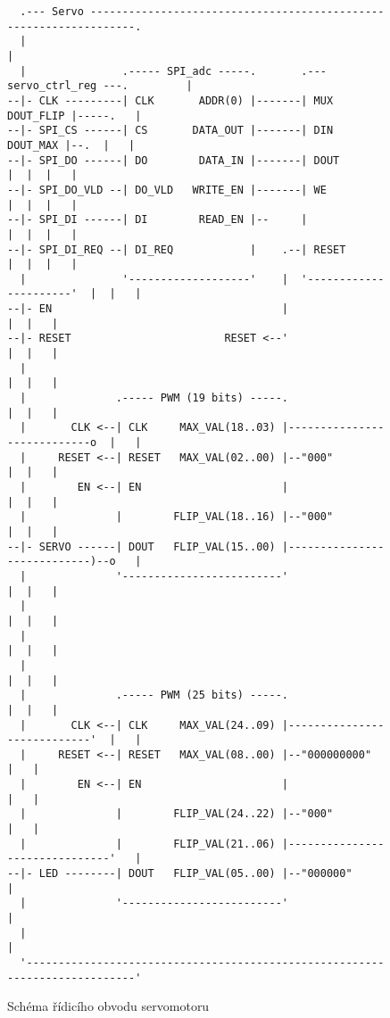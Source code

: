 \begin{figure}[h]
\caption{Schéma řídicího obvodu servomotoru}
\centering
\begin{Verbatim}
  .--- Servo ------------------------------------------------------------------.
  |                                                                            |
  |               .----- SPI_adc -----.       .--- servo_ctrl_reg ---.         |
--|- CLK ---------| CLK       ADDR(0) |-------| MUX        DOUT_FLIP |-----.   |
--|- SPI_CS ------| CS       DATA_OUT |-------| DIN         DOUT_MAX |--.  |   |
--|- SPI_DO ------| DO        DATA_IN |-------| DOUT                 |  |  |   |
--|- SPI_DO_VLD --| DO_VLD   WRITE_EN |-------| WE                   |  |  |   |
--|- SPI_DI ------| DI        READ_EN |--     |                      |  |  |   |
--|- SPI_DI_REQ --| DI_REQ            |    .--| RESET                |  |  |   |
  |               '-------------------'    |  '----------------------'  |  |   |
--|- EN                                    |                            |  |   |
--|- RESET                        RESET <--'                            |  |   |
  |                                                                     |  |   |
  |              .----- PWM (19 bits) -----.                            |  |   |
  |       CLK <--| CLK     MAX_VAL(18..03) |----------------------------o  |   |
  |     RESET <--| RESET   MAX_VAL(02..00) |--"000"                     |  |   |
  |        EN <--| EN                      |                            |  |   |
  |              |        FLIP_VAL(18..16) |--"000"                     |  |   |
--|- SERVO ------| DOUT   FLIP_VAL(15..00) |----------------------------)--o   |
  |              '-------------------------'                            |  |   |
  |                                                                     |  |   |
  |                                                                     |  |   |
  |                                                                     |  |   |
  |              .----- PWM (25 bits) -----.                            |  |   |
  |       CLK <--| CLK     MAX_VAL(24..09) |----------------------------'  |   |
  |     RESET <--| RESET   MAX_VAL(08..00) |--"000000000"                  |   |
  |        EN <--| EN                      |                               |   |
  |              |        FLIP_VAL(24..22) |--"000"                        |   |
  |              |        FLIP_VAL(21..06) |-------------------------------'   |
--|- LED --------| DOUT   FLIP_VAL(05..00) |--"000000"                         |
  |              '-------------------------'                                   |
  |                                                                            |
  '----------------------------------------------------------------------------'
\end{Verbatim}
\end{figure}


